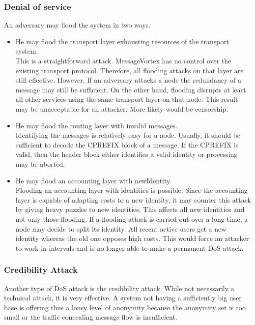\subsubsection{Denial of service}
An adversary may flood the system in two ways.
\begin{itemize}
	\item He may flood the transport layer exhausting resources of the transport system.\\
	      This is a straightforward attack. MessageVortex has no control over the existing transport protocol. Therefore, all flooding attacks on that layer are still effective. However, If an adversary attacks a node the redundancy of a message may still be sufficient. On the other hand, flooding disrupts at least all other services using the same transport layer on that node. This result may be unacceptable for an attacker. More likely would be censorship.
	\item He may flood the routing layer with invalid messages.\\ 
	      Identifying the messages is relatively easy for a node. Usually, it should be sufficient to decode the CPREFIX block of a message. If the CPREFIX is valid, then the header block either identifies a valid identity or processing may be aborted. 
	\item He may flood an accounting layer with newIdentity.\\
          Flooding an accounting layer with identities is possible. Since the accounting layer is capable of adapting costs to a new identity, it may counter this attack by giving heavy puzzles to new identities. This affects all new identities and not only those flooding. If a flooding attack is carried out over a long time, a node may decide to split its identity. All recent active users get a new identity whereas the old one opposes high costs. This would force an attacker to work in intervals and is no longer able to make a permanent DoS attack.
\end{itemize}

\subsubsection{Credibility Attack}
Another type of DoS attack is the credibility attack. While not necessarily a technical attack, it is very effective. A system not having a sufficiently big user base is offering thus a lousy level of anonymity because the anonymity set is too small or the traffic concealing message flow is insufficient. 

